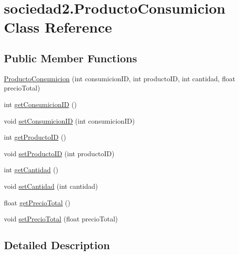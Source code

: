 \hypertarget{classsociedad2_1_1_producto_consumicion}{}\section{sociedad2.\+Producto\+Consumicion Class Reference}
\label{classsociedad2_1_1_producto_consumicion}
\subsection*{Public Member Functions}
\begin{DoxyCompactItemize}
\item 
\mbox{\hyperlink{classsociedad2_1_1_producto_consumicion_a86e9b27ae98eaa43cc86f87ca2388e60}{Producto\+Consumicion}} (int consumicion\+ID, int producto\+ID, int cantidad, float precio\+Total)
\item 
int \mbox{\hyperlink{classsociedad2_1_1_producto_consumicion_a4e4230046347bb46f7ef306fb443320d}{get\+Consumicion\+ID}} ()
\item 
void \mbox{\hyperlink{classsociedad2_1_1_producto_consumicion_a28951a9049e55f281f5a13ddd8b73b78}{set\+Consumicion\+ID}} (int consumicion\+ID)
\item 
int \mbox{\hyperlink{classsociedad2_1_1_producto_consumicion_a65dd89a3d347d456c4db714b7089ad95}{get\+Producto\+ID}} ()
\item 
void \mbox{\hyperlink{classsociedad2_1_1_producto_consumicion_a0fe9398fbe6b1d063d39d0398f6f87fa}{set\+Producto\+ID}} (int producto\+ID)
\item 
int \mbox{\hyperlink{classsociedad2_1_1_producto_consumicion_a083306b65306926b265c534df7ce902e}{get\+Cantidad}} ()
\item 
void \mbox{\hyperlink{classsociedad2_1_1_producto_consumicion_aabf7ed1d1ea38ab69262c3ae7c47b69d}{set\+Cantidad}} (int cantidad)
\item 
float \mbox{\hyperlink{classsociedad2_1_1_producto_consumicion_af1415606b9baa2aee72bf04bae83c579}{get\+Precio\+Total}} ()
\item 
void \mbox{\hyperlink{classsociedad2_1_1_producto_consumicion_adffac28a284684e44d79ac564ef5943a}{set\+Precio\+Total}} (float precio\+Total)
\end{DoxyCompactItemize}


\subsection{Detailed Description}


